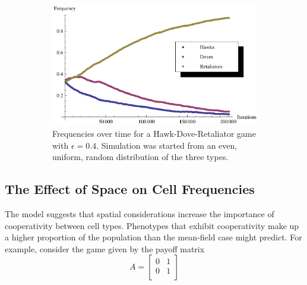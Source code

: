 \documentclass[12pt]{amsart}
\begin{document}
\begin{figure}[ht]
	\begin{subfigure}[b]{0.3\textwidth}
		\includegraphics[width = \textwidth]{Diagrams/HDR/R_freqs}
		\caption{Frequencies over time for a Hawk-Dove-Retaliator game with $\epsilon = 0.4$. 			Simulation was started from an even, uniform, random distribution of the three types.}
		\label{fig:R_freqs}
	\end{subfigure}
	
	\caption{}\label{fig:lakfhdsalgkh}
\end{figure}

  	
\pagebreak

\subsection{The Effect of Space on Cell Frequencies}
The model suggests that spatial considerations increase the importance of cooperativity between cell types. Phenotypes that exhibit cooperativity make up a higher proportion of the population than the mean-field case might predict. For example, consider the game given by the payoff matrix
$$A = {\begin{bmatrix}
  0 & 1\\
  0 & 1 \\
\end{bmatrix}}$$
\end{document}
